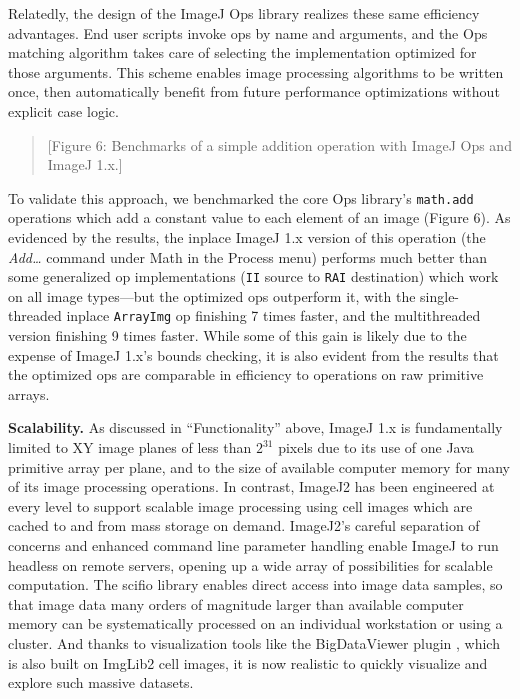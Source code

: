 \documentclass{bmcart}
\begin{document}
Relatedly, the design of the ImageJ Ops library realizes these same efficiency
advantages. End user scripts invoke ops by name and arguments, and the Ops
matching algorithm takes care of selecting the implementation optimized for
those arguments. This scheme enables image processing algorithms to be written
once, then automatically benefit from future performance optimizations without
explicit case logic.

\begin{quote}
[Figure 6: Benchmarks of a simple addition operation with ImageJ Ops and ImageJ
1.x.]
\end{quote}

To validate this approach, we benchmarked the core Ops library's
\texttt{math.add} operations which add a constant value to each element of an
image (Figure 6). As evidenced by the results, the inplace ImageJ 1.x version
of this operation (the \textit{Add\ldots} command under Math in the Process
menu) performs much better than some generalized op implementations
(\texttt{II} source to \texttt{RAI} destination) which work on all image
types---but the optimized ops outperform it, with the single-threaded inplace
\texttt{ArrayImg} op finishing 7 times faster, and the multithreaded version
finishing 9 times faster. While some of this gain is likely due to the expense
of ImageJ 1.x's bounds checking, it is also evident from the results that the
optimized ops are comparable in efficiency to operations on raw primitive
arrays.

\textbf{Scalability.} As discussed in ``Functionality'' above, ImageJ 1.x is
fundamentally limited to XY image planes of less than $2^{31}$ pixels due to
its use of one Java primitive array per plane, and to the size of available
computer memory for many of its image processing operations. In contrast,
ImageJ2 has been engineered at every level to support scalable image processing
using cell images which are cached to and from mass storage on demand.
ImageJ2's careful separation of concerns and enhanced command line parameter
handling enable ImageJ to run headless on remote servers, opening up a wide
array of possibilities for scalable computation. The \acrshort{scifio} library
enables direct access into image data samples, so that image data many orders
of magnitude larger than available computer memory can be systematically
processed on an individual workstation or using a cluster. And thanks to
visualization tools like the BigDataViewer plugin \cite{bigdataviewer}, which
is also built on ImgLib2 cell images, it is now realistic to quickly visualize
and explore such massive datasets.
\end{document}
